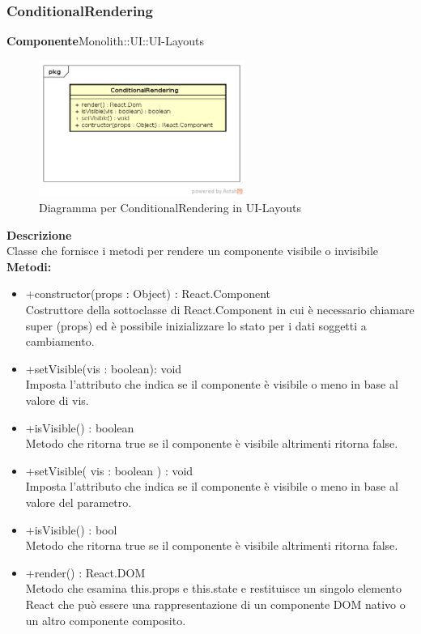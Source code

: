 \subsubsection{ConditionalRendering}
\textbf{Componente}Monolith::UI::UI-Layouts\\
   \FloatBarrier
   \begin{figure}[ht]
   \centering
   \includegraphics[width=0.6\textwidth]{img/single-ConditionalRendering}
   \caption{{Diagramma per ConditionalRendering in UI-Layouts}}
\end{figure}
\FloatBarrier
\textbf{Descrizione}\\
Classe che fornisce i metodi per rendere un componente visibile o invisibile
\textbf{Metodi:} \\
\begin{itemize}\item +constructor(props : Object) : React.Component \\Costruttore della sottoclasse di React.Component in cui è necessario chiamare super (props) ed è possibile inizializzare lo stato per i dati soggetti a cambiamento.\item +setVisible(vis : boolean): void \\Imposta l'attributo che indica se il componente è visibile o meno in base al valore di vis.\item +isVisible() : boolean \\Metodo che ritorna true se il componente è visibile altrimenti ritorna false.\item +setVisible( vis : boolean ) : void \\Imposta l'attributo che indica se il componente è visibile o meno in base al valore del parametro.\item +isVisible() : bool \\Metodo che ritorna true se il componente è visibile altrimenti ritorna false.\item +render() : React.DOM \\Metodo che esamina this.props e this.state e restituisce un singolo elemento React che può essere una rappresentazione di un componente DOM nativo o un altro componente composito.\end{itemize} 


